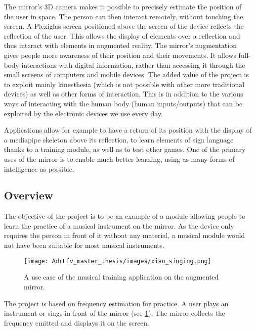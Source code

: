 The mirror’s 3D camera makes it possible to precisely estimate the position of the user in  space. The person can then interact remotely, without touching the screen. A Plexiglas screen positioned above the screen of the device reflects the reflection of the user. This allows the display of elements over a reflection and thus interact with elements in augmented reality. The mirror’s augmentation gives people more awareness of their position and their movements. It allows full-body interactions with digital information, rather than accessing it through the small screens of computers and mobile devices. The added value of the project is to exploit mainly kinesthesia (which is not possible with other more traditional devices) as well as other forms of interaction. This is in addition to the various ways of interacting with the human body (human inputs/outputs) that can be exploited by the electronic devices we use every day.

Applications allow for example to have a return of its position with the display of a mediapipe skeleton above its reflection, to learn elements of sign language thanks to a training module, as well as to test other games. One of the primary uses of the mirror is to enable much better learning, using as many forms of intelligence as possible.

\subsection{Overview}

The objective of the project is to be an example of a module allowing people to learn the practice of a musical instrument on the mirror. As the device only requires the person in front of it without any material, a musical module would not have been suitable for most musical instruments.


\begin{figure}[h]
    \centering
    \texttt{[image: AdrLfv\_master\_thesis/images/xiao\_singing.png]}
    \caption{A use case of the musical training application on the augmented mirror.}
    \label{fig:xiao_singing}
\end{figure}

The project is based on frequency estimation for practice. A user plays an instrument or sings in front of the mirror (see \ref{fig:xiao_singing}). The mirror collects the frequency emitted and displays it on the screen.

